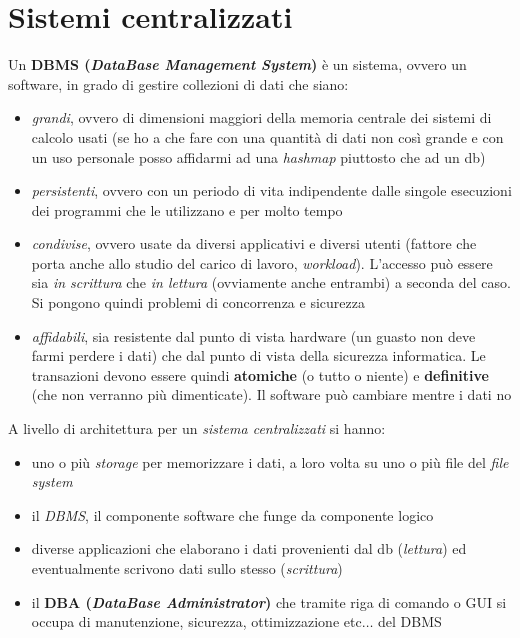 \documentclass[a4paper,12pt, oneside]{book}
\begin{document}
\chapter{Sistemi centralizzati}
\begin{definizione}
  Un \textbf{DBMS (\textit{DataBase Management System})} è un sistema, ovvero un
  software, in grado di gestire collezioni di dati che siano:
  \begin{itemize}
    \item \textit{grandi}, ovvero di dimensioni maggiori della memoria centrale
    dei sistemi di calcolo usati (se ho a che fare con una quantità di dati non
    così grande e con un uso personale posso affidarmi ad una \textit{hashmap}
    piuttosto che ad un db)
    \item \textit{persistenti}, ovvero con un periodo di vita indipendente dalle
    singole esecuzioni dei programmi che le utilizzano e per molto tempo 
    \item \textit{condivise}, ovvero usate da diversi applicativi e diversi
    utenti (fattore che porta anche allo studio del carico di lavoro,
    \textit{workload}). L'accesso può essere sia \textit{in scrittura} che
    \textit{in lettura} (ovviamente anche entrambi) a seconda del caso. Si
    pongono quindi problemi di concorrenza e sicurezza
    \item \textit{affidabili}, sia resistente dal punto di vista hardware (un
    guasto non deve farmi perdere i dati) che dal punto di vista della sicurezza
    informatica. Le transazioni devono essere quindi \textbf{atomiche} (o tutto
    o niente) e \textbf{definitive} (che non verranno più dimenticate). Il
    software può cambiare mentre i dati no
  \end{itemize}
\end{definizione}
A livello di architettura per un \textit{sistema centralizzati} si hanno:
\begin{itemize}
  \item uno o più \textit{storage} per memorizzare i dati, a loro volta su uno o
  più file del \textit{file system}
  \item il \textit{DBMS}, il componente software che funge da componente logico
  \item diverse applicazioni che elaborano i dati provenienti dal db
  (\textit{lettura}) ed eventualmente scrivono dati sullo stesso
  (\textit{scrittura})
  \item il \textbf{DBA (\textit{DataBase Administrator})} che tramite riga di
  comando o GUI si occupa di manutenzione, sicurezza, ottimizzazione etc$\ldots$
  del DBMS 
\end{itemize}
\end{document}
